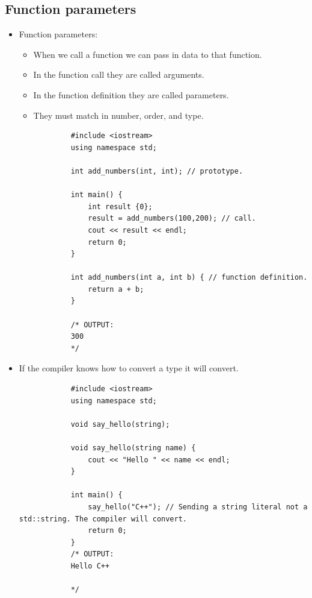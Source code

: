 \subsection{Function parameters}
\begin{itemize}
    \item Function parameters:
        \begin{itemize}
            \item When we call a function we can pass in data to that function.
            \item In the function call they are called arguments.
            \item In the function definition they are called parameters.
            \item They must match in number, order, and type.
        \end{itemize}
        \begin{verbatim}
            #include <iostream>
            using namespace std;

            int add_numbers(int, int); // prototype.
                        
            int main() {
                int result {0};
                result = add_numbers(100,200); // call.
                cout << result << endl;
                return 0;
            }

            int add_numbers(int a, int b) { // function definition.
                return a + b;
            }

            /* OUTPUT:
            300
            */
        \end{verbatim}

    \item If the compiler knows how to convert a type it will convert.
        \begin{verbatim}
            #include <iostream>
            using namespace std;

            void say_hello(string);

            void say_hello(string name) {
                cout << "Hello " << name << endl;
            }

            int main() {
                say_hello("C++"); // Sending a string literal not a std::string. The compiler will convert.
                return 0;
            }
            /* OUTPUT:
            Hello C++

            */
        \end{verbatim}
    

\end{itemize}
